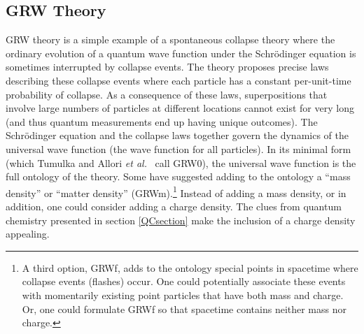 \documentclass[12pt,onecolumn,secnumarabic,amsmath,amssymb,balancelastpage,nofootinbib]{article}
\begin{document}
\subsection{GRW Theory}\label{GRWsection}

GRW theory is a simple example of a spontaneous collapse theory where the ordinary evolution of a quantum wave function under the Schr\"{o}dinger equation is sometimes interrupted by collapse events.  The theory proposes precise laws describing these collapse events where each particle has a constant per-unit-time probability of collapse.  As a consequence of these laws, superpositions that involve large numbers of particles at different locations cannot exist for very long (and thus quantum measurements end up having unique outcomes).  The Schr\"{o}dinger equation and the collapse laws together govern the dynamics of the universal wave function (the wave function for all particles).  In its minimal form (which Tumulka \cite{tumulka2007} and Allori \emph{et al.}\ \cite{allori2008} call GRW$0$), the universal wave function is the full ontology of the theory.  Some have suggested adding to the ontology a ``mass density'' or ``matter density'' (GRWm).\footnote{A third option, GRWf, adds to the ontology special points in spacetime where collapse events (flashes) occur.  One could potentially associate these events with momentarily existing point particles that have both mass and charge.  Or, one could formulate GRWf so that spacetime contains neither mass nor charge.}  Instead of adding a mass density, or in addition, one could consider adding a charge density.  The clues from quantum chemistry presented in section \ref{QCsection} make the inclusion of a charge density appealing.
\end{document}
